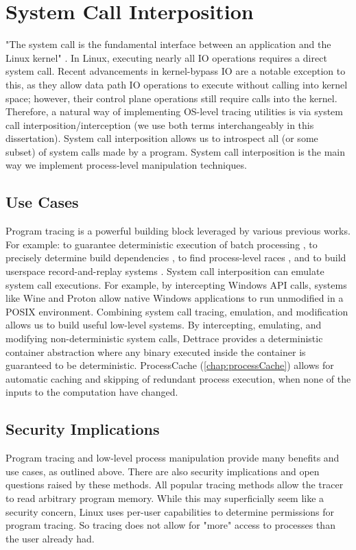 \section{System Call Interposition}
 "The system call is the fundamental interface between an application and the Linux kernel" \cite{syscall}. In Linux, executing nearly all IO operations requires a direct system call. Recent advancements in kernel-bypass IO are a notable exception to this, as they allow data path IO operations to execute without calling into kernel space; however, their control plane operations still require calls into the kernel. Therefore, a natural way of implementing OS-level tracing utilities is via system call interposition/interception (we use both terms interchangeably in this dissertation). System call interposition allows us to introspect all (or some subset) of system calls made by a program.  System call interposition is the main way we implement process-level manipulation techniques.

\subsection{Use Cases}
Program tracing is a powerful building block leveraged by various previous works. For example: to guarantee deterministic execution of batch processing \citep{detflow}, to precisely determine build dependencies \citep{perfectDependencies}, to find process-level races \citep{racepro}, and to build userspace record-and-replay systems \cite{mozilla-rr}. System call interposition can emulate system call executions. For example, by intercepting Windows API calls, systems like Wine \citep{wine} and Proton \citep{valve-proton} allow native Windows applications to run unmodified in a POSIX environment. Combining system call tracing, emulation, and modification allows us to build useful low-level systems. By intercepting, emulating, and modifying non-deterministic system calls, Dettrace \citep{dettrace} provides a deterministic container abstraction where any binary executed inside the container is guaranteed to be deterministic. ProcessCache (\ref{chap:processCache}) allows for automatic caching and skipping of redundant process execution, when none of the inputs to the computation have changed. 

\subsection{Security Implications}
Program tracing and low-level process manipulation provide many benefits and use cases, as outlined above. There are also security implications and open questions raised by these methods. All popular tracing methods allow the tracer to read arbitrary program memory. While this may superficially seem like a security concern, Linux uses per-user capabilities to determine permissions for program tracing. So tracing does not allow for "more" access to processes than the user already had.

